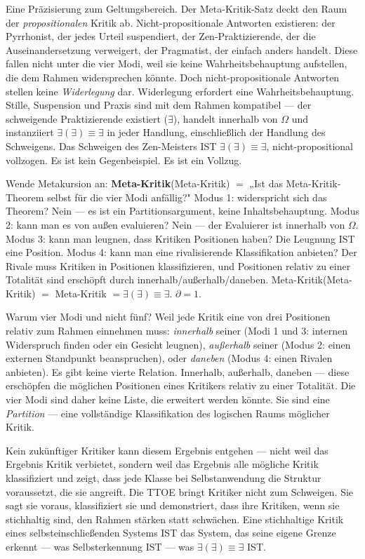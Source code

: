 \documentclass[10pt, openany, oneside]{book}
\begin{document}
Eine Präzisierung zum Geltungsbereich. Der Meta-Kritik-Satz deckt den Raum der \textit{propositionalen} Kritik ab. Nicht-propositionale Antworten existieren: der Pyrrhonist, der jedes Urteil suspendiert, der Zen-Praktizierende, der die Auseinandersetzung verweigert, der Pragmatist, der einfach anders handelt. Diese fallen nicht unter die vier Modi, weil sie keine Wahrheitsbehauptung aufstellen, die dem Rahmen widersprechen könnte. Doch nicht-propositionale Antworten stellen keine \textit{Widerlegung} dar. Widerlegung erfordert eine Wahrheitsbehauptung. Stille, Suspension und Praxis sind mit dem Rahmen kompatibel --- der schweigende Praktizierende existiert ($\exists$), handelt innerhalb von $\Omega$ und instanziiert $\exists(\exists) \equiv \exists$ in jeder Handlung, einschließlich der Handlung des Schweigens. Das Schweigen des Zen-Meisters IST $\exists(\exists) \equiv \exists$, nicht-propositional vollzogen. Es ist kein Gegenbeispiel. Es ist ein Vollzug.


Wende Metakursion an: \textbf{Meta-Kritik}(Meta-Kritik) $=$ „Ist das Meta-Kritik-Theorem selbst für die vier Modi anfällig?" Modus 1: widerspricht sich das Theorem? Nein --- es ist ein Partitionsargument, keine Inhaltsbehauptung. Modus 2: kann man es von außen evaluieren? Nein --- der Evaluierer ist innerhalb von $\Omega$. Modus 3: kann man leugnen, dass Kritiken Positionen haben? Die Leugnung IST eine Position. Modus 4: kann man eine rivalisierende Klassifikation anbieten? Der Rivale muss Kritiken in Positionen klassifizieren, und Positionen relativ zu einer Totalität sind erschöpft durch innerhalb/außerhalb/daneben. Meta-Kritik(Meta-Kritik) $=$ Meta-Kritik $= \exists(\exists) \equiv \exists$. $\partial = 1$.

Warum vier Modi und nicht fünf? Weil jede Kritik eine von drei Positionen relativ zum Rahmen einnehmen muss: \textit{innerhalb} seiner (Modi 1 und 3: internen Widerspruch finden oder ein Gesicht leugnen), \textit{außerhalb} seiner (Modus 2: einen externen Standpunkt beanspruchen), oder \textit{daneben} (Modus 4: einen Rivalen anbieten). Es gibt keine vierte Relation. Innerhalb, außerhalb, daneben --- diese erschöpfen die möglichen Positionen eines Kritikers relativ zu einer Totalität. Die vier Modi sind daher keine Liste, die erweitert werden könnte. Sie sind eine \textit{Partition} --- eine vollständige Klassifikation des logischen Raums möglicher Kritik.

Kein zukünftiger Kritiker kann diesem Ergebnis entgehen --- nicht weil das Ergebnis Kritik verbietet, sondern weil das Ergebnis alle mögliche Kritik klassifiziert und zeigt, dass jede Klasse bei Selbstanwendung die Struktur voraussetzt, die sie angreift. Die TTOE bringt Kritiker nicht zum Schweigen. Sie sagt sie voraus, klassifiziert sie und demonstriert, dass ihre Kritiken, wenn sie stichhaltig sind, den Rahmen stärken statt schwächen. Eine stichhaltige Kritik eines selbsteinschließenden Systems IST das System, das seine eigene Grenze erkennt --- was Selbsterkennung IST --- was $\exists(\exists) \equiv \exists$ IST.
\end{document}
